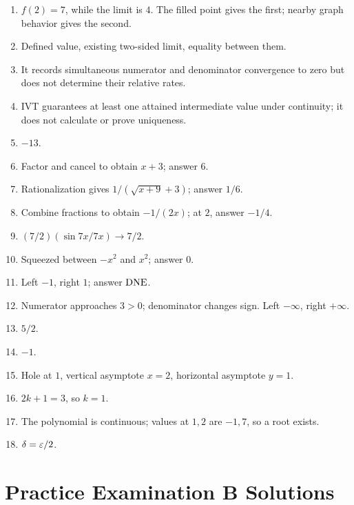 \begin{enumerate}[label=\textbf{A\arabic*.}]
  \item \(f(2)=7\), while the limit is \(4\). The filled point gives the first; nearby graph behavior gives the second.
  \item Defined value, existing two-sided limit, equality between them.
  \item It records simultaneous numerator and denominator convergence to zero but does not determine their relative rates.
  \item IVT guarantees at least one attained intermediate value under continuity; it does not calculate or prove uniqueness.
  \item \(-13\).
  \item Factor and cancel to obtain \(x+3\); answer \(6\).
  \item Rationalization gives \(1/(\sqrt{x+9}+3)\); answer \(1/6\).
  \item Combine fractions to obtain \(-1/(2x)\); at \(2\), answer \(-1/4\).
  \item \((7/2)(\sin7x/7x)\to7/2\).
  \item Squeezed between \(-x^2\) and \(x^2\); answer \(0\).
  \item Left \(-1\), right \(1\); answer \(\mathrm{DNE}\).
  \item Numerator approaches \(3>0\); denominator changes sign. Left \(-\infty\), right \(+\infty\).
  \item \(5/2\).
  \item \(-1\).
  \item Hole at \(1\), vertical asymptote \(x=2\), horizontal asymptote \(y=1\).
  \item \(2k+1=3\), so \(k=1\).
  \item The polynomial is continuous; values at \(1,2\) are \(-1,7\), so a root exists.
  \item \(\delta=\varepsilon/2\).
\end{enumerate}

\section{Practice Examination B Solutions}

